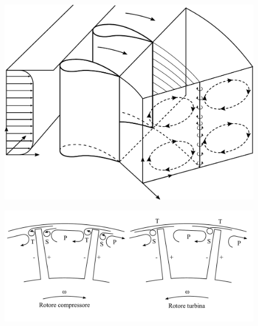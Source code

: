 \begin{figure}[h!]
\centering
  \includegraphics[width=.6\textwidth]{fig/VortVall.pdf}
\caption{}
\label{fd:VortVall}
\end{figure}
\begin{figure}[h!]
\centering
  \includegraphics[width=.8\textwidth]{fig/VortTraf.pdf}
\caption{}
\label{fd:VortTraf}
\end{figure}